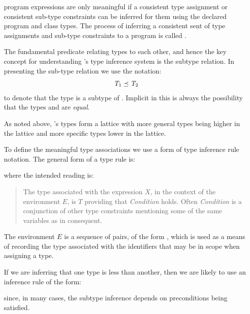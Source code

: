 \go program expressions are only meaningful if a consistent type assignment or consistent sub-type constraints  can be inferred for them using the declared program and class types. The process of inferring a consistent sent of type assignments and sub-type constraints to a \go program is called .

The fundamental predicate relating types to each other, and hence the key concept for understanding \go's type inference system is the subtype relation. In presenting the sub-type relation we use the notation:
\begin{equation}
\subtype{T\sub{1}}{T\sub2}
\end{equation}
to denote that the type  is a subtype of . Implicit in this is always the possibility that the types  and  are \emph{equal}.

As noted above, \go's types form a lattice with more general types being higher in the lattice and more specific types lower in the lattice. 

To define the meaningful type associations we use a form of type inference rule notation. The general form of a type rule is:

\begin{prooftree}
\end{prooftree}
where the intended reading is:
\begin{quote}
The type associated with the expression $X$, in the context of the environment $E$, is $T$ providing that \emph{Condition} holds. Often \emph{Condition} is a conjunction of other type constraints mentioning some of the same variables as in consequent.
\end{quote}
The environment $E$ is a sequence of pairs, of the form , which is used as a means of recording the type associated with the identifiers that may be in scope when assigning a type.

If we are inferring that one type is less than another, then we are likely to use an inference rule of the form:
\begin{prooftree}
\end{prooftree}
since, in many cases, the subtype inference depends on preconditions being satisfied.

